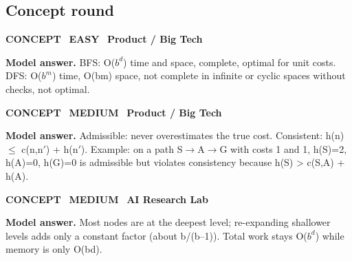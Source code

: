 \documentclass[11pt]{article}
\begin{document}
\subsection*{\color{teal}Concept round}
\begin{tcolorbox}[enhanced,breakable,colback=white,colframe=teal,arc=2mm,boxrule=0.8pt,left=3mm,right=3mm,
 title={\textbf{QII.01}\quad Compare BFS and DFS on time, space, completeness and optimality.},fonttitle=\color{white}\small,colbacktitle=teal]
\colorbox{teal!15}{\scriptsize\bfseries\color{teal} CONCEPT}\
\colorbox{leaf!15}{\scriptsize\bfseries\color{leaf} EASY}\
\colorbox{navy!8}{\scriptsize\bfseries\color{navy} Product / Big Tech}\par\smallskip
\textbf{\color{navy}Model answer.} BFS: O($b^{d}$) time and space, complete, optimal for unit costs. DFS: O($b^{m}$) time, O(bm) space, not complete in infinite or cyclic spaces without checks, not optimal.
\end{tcolorbox}
\begin{tcolorbox}[enhanced,breakable,colback=white,colframe=teal,arc=2mm,boxrule=0.8pt,left=3mm,right=3mm,
 title={\textbf{QII.02}\quad What makes a heuristic admissible and consistent? Give an example that is admissible but not consistent.},fonttitle=\color{white}\small,colbacktitle=teal]
\colorbox{teal!15}{\scriptsize\bfseries\color{teal} CONCEPT}\
\colorbox{gold!85!black!15}{\scriptsize\bfseries\color{gold!85!black} MEDIUM}\
\colorbox{navy!8}{\scriptsize\bfseries\color{navy} Product / Big Tech}\par\smallskip
\textbf{\color{navy}Model answer.} Admissible: never overestimates the true cost. Consistent: h(n) $\le$ c(n,n$'$) + h(n$'$). Example: on a path S$\to$A$\to$G with costs 1 and 1, h(S)=2, h(A)=0, h(G)=0 is admissible but violates consistency because h(S) > c(S,A) + h(A).
\end{tcolorbox}
\begin{tcolorbox}[enhanced,breakable,colback=white,colframe=teal,arc=2mm,boxrule=0.8pt,left=3mm,right=3mm,
 title={\textbf{QII.03}\quad Why is iterative deepening not much slower than BFS?},fonttitle=\color{white}\small,colbacktitle=teal]
\colorbox{teal!15}{\scriptsize\bfseries\color{teal} CONCEPT}\
\colorbox{gold!85!black!15}{\scriptsize\bfseries\color{gold!85!black} MEDIUM}\
\colorbox{navy!8}{\scriptsize\bfseries\color{navy} AI Research Lab}\par\smallskip
\textbf{\color{navy}Model answer.} Most nodes are at the deepest level; re-expanding shallower levels adds only a constant factor (about b/(b--1)). Total work stays O($b^{d}$) while memory is only O(bd).
\end{tcolorbox}
\end{document}
